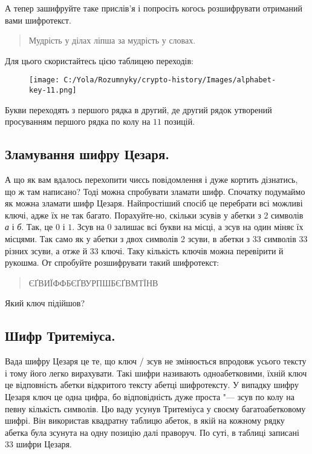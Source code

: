 \documentclass{book}
\begin{document}
А тепер зашифруйте таке прислів'я і попросіть когось розшифрувати
отриманий вами шифротекст.

\begin{quote}
    Мудрість у ділах ліпша за мудрість у словах.
\end{quote}

Для цього скористайтесь цією таблицею переходів:

\begin{figure}[hbt!]
	\centering
	\texttt{[image: C:/Yola/Rozumnyky/crypto-history/Images/alphabet-key-11.png]}
\end{figure}

Букви переходять з першого рядка в другий, де другий рядок утворений просуванням
першого рядка по колу на $11$ позицій.

\subsection*{Зламування шифру Цезаря.}

А що як вам вдалось перехопити чиєсь повідомлення і дуже кортить дізнатись,
що ж там написано? Тоді можна спробувати зламати шифр. Спочатку подумаймо як
можна зламати шифр Цезаря. Найпростіший спосіб це перебрати всі можливі ключі,
адже їх не так багато. Порахуйте-но, скільки зсувів у абетки з 2 символів
\emph{а} і \emph{б}. Так, це $0$ і $1$. Зсув на $0$ залишає всі букви на місці,
а зсув на один міняє їх місцями. Так само як у абетки з двох символів 2 зсуви,
в абетки з 33 символів 33 різних зсуви, а отже й 33 ключі. Таку кількість ключів
можна перевірити й рукошма. От спробуйте розшифрувати такий шифротекст:

\begin{quote}
	ЄҐВИЇФФБЄҐВУРПШБЄҐВМТЇНВ
\end{quote}

Який ключ підійшов?

\subsection*{Шифр Тритеміуса.}

Вада шифру Цезаря це те, що ключ / зсув не змінюється впродовж усього тексту і
тому його легко вирахувати. Такі шифри називають одноабетковими, їхній ключ це
відповність абетки відкритого тексту абетці шифротексту. У випадку шифру Цезаря
ключ це одна цифра, бо відповідність дуже проста "--- зсув по колу на певну
кількість символів. Цю ваду усунув Тритеміуса у своєму багатоабетковому шифрі.
Він використав квадратну таблицю абеток, в якій на кожному рядку абетка була
зсунута на одну позицію далі праворуч. По суті, в таблиці записані 33 шифри
Цезаря.
\end{document}

